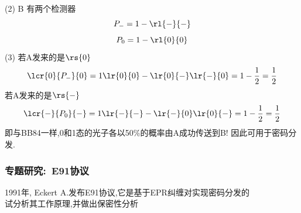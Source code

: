 \begin{frame}
  \frametitle{}
 (2) B 有两个检测器
 \[ P_{-}=1-\rl{-}{-}\]
 \[ P_{0}=1-\rl{0}{0}\]
 (3) 若A发来的是$ \rs{0} $ 
    \[\lcr{0}{P_{-}}{0}=1\lr{0}{0}-\lr{0}{-}\lr{-}{0}=1-\frac{1}{2}=\frac{1}{2}\]
    若A发来的是$ \rs{-} $ 
    \[\lcr{-}{P_0}{-}=1\lr{-}{-}-\lr{-}{0}\lr{0}{-}=1-\frac{1}{2}=\frac{1}{2}\]
    即与BB84一样,0和1态的光子各以50\%的概率由A成功传送到B! 因此可用于密码分发.
\end{frame}

\begin{frame}
  \frametitle{专题研究:~E91协议}
  1991年, Eckert A.发布E91协议,它是基于EPR纠缠对实现密码分发的\\
   试分析其工作原理,并做出保密性分析
\end{frame}
